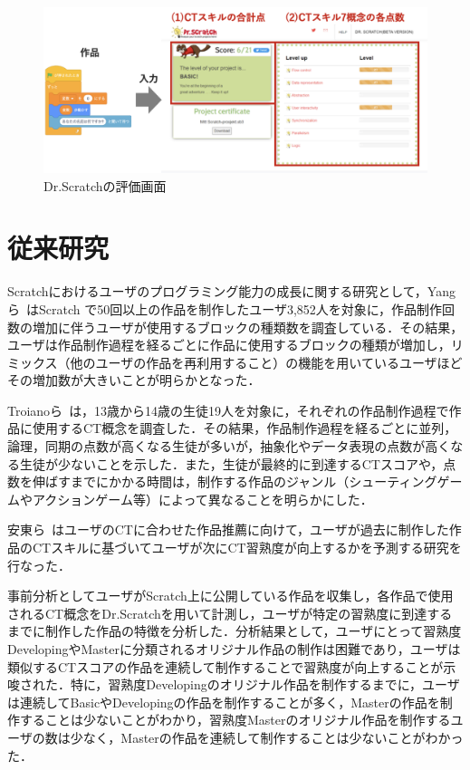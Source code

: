 \documentclass[11pt,dvipdfmx]{jreport}
\begin{document}
\begin{figure}[t]
	\centering
	\includegraphics[width=1.0\linewidth]{Okamoto_fig/drscratch.pdf}
	\caption{Dr.Scratchの評価画面}
	\label{fig:drscratch}
\end{figure}

\section{従来研究}
Scratchにおけるユーザのプログラミング能力の成長に関する研究として，Yangら~\cite{Yang_2015}はScratch
で50回以上の作品を制作したユーザ3,852人を対象に，作品制作回数の増加に伴うユーザが使用するブロックの種類数を調査している．その結果，ユーザは作品制作過程を経るごとに作品に使用するブロックの種類が増加し，リミックス（他のユーザの作品を再利用すること）の機能を用いているユーザほどその増加数が大きいことが明らかとなった．

Troianoら~\cite{Troiano_2019}は，13歳から14歳の生徒19人を対象に，それぞれの作品制作過程で作品に使用するCT概念を調査した．その結果，作品制作過程を経るごとに並列，論理，同期の点数が高くなる生徒が多いが，抽象化やデータ表現の点数が高くなる生徒が少ないことを示した．また，生徒が最終的に到達するCTスコアや，点数を伸ばすまでにかかる時間は，制作する作品のジャンル（シューティングゲームやアクションゲーム等）によって異なることを明らかにした．

安東ら~\cite{Ando_2021}はユーザのCTに合わせた作品推薦に向けて，ユーザが過去に制作した作品のCTスキルに基づいてユーザが次にCT習熟度が向上するかを予測する研究を行なった．

事前分析としてユーザがScratch上に公開している作品を収集し，各作品で使用されるCT概念をDr.Scratchを用いて計測し，ユーザが特定の習熟度に到達するまでに制作した作品の特徴を分析した．分析結果として，ユーザにとって習熟度DevelopingやMasterに分類されるオリジナル作品の制作は困難であり，ユーザは類似するCTスコアの作品を連続して制作することで習熟度が向上することが示唆された．特に，習熟度Developingのオリジナル作品を制作するまでに，ユーザは連続してBasicやDevelopingの作品を制作することが多く，Masterの作品を制作することは少ないことがわかり，習熟度Masterのオリジナル作品を制作するユーザの数は少なく，Masterの作品を連続して制作することは少ないことがわかった．
\end{document}
